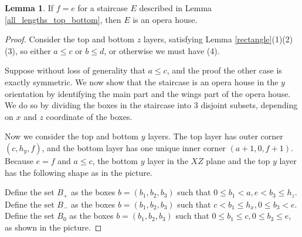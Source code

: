 \documentclass{amsart}[10pt]
\theoremstyle{plain}
\theoremstyle{definition}
\newtheorem{lemma}[theorem]{Lemma}
\begin{document}
\begin{lemma}
\label{f=e}
If $f=e$ for a staircase $E$ described in Lemma \ref{all_lengths_top_bottom}, then $E$ is an opera house.
\end{lemma}

\begin{proof}
Consider the top and bottom $z$ layers, satisfying Lemma \ref{rectangle}(1)(2)(3), so either $a \leq c$ or $b \leq d$, or otherwise we must have (4). 

Suppose without loss of generality that $a \leq c$, and the proof the other case is exactly symmetric. We now show that the staircase is an opera house in the $y$ orientation by identifying the main part and the wings part of the opera house. We do so by dividing the boxes in the staircase into $3$ disjoint subsets, depending on $x$ and $z$ coordinate of the boxes.

Now we consider the top and bottom $y$ layers. The top layer has outer corner $(c, h_y, f)$, and the bottom layer has one unique inner corner $(a+1, 0,f+1)$. Because $e=f$ and $a \leq c$, the bottom $y$ layer in the $XZ$ plane and the top $y$ layer has the following shape as in the picture. 

Define the set $B_+$ as the boxes $b=(b_1, b_2,b_3)$ such that $0 \leq b_1 < a, e < b_3 \leq h_z$. Define the set $B_-$ as the boxes $b=(b_1, b_2,b_3)$ such that $c < b_1 \leq h_x, 0 \leq b_3 < e$. Define the set $B_0$ as the boxes $b=(b_1, b_2,b_3)$ such that $0 \leq b_1 \leq c, 0 \leq b_3 \leq e$, as shown in the picture. 


\end{proof}
\end{document}
